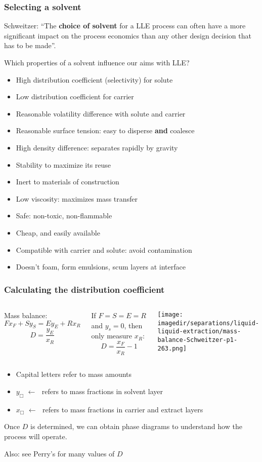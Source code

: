 \begin{frame}\frametitle{Selecting a solvent}
	Schweitzer: ``The \textbf{choice of solvent} for a LLE process can often have a more significant impact on the process economics than any other design decision that has to be made''.
	
	\vspace{12pt}
	Which properties of a solvent influence our aims with LLE?
	\begin{itemize}
		\item	High distribution coefficient (selectivity) for solute 
		\item	Low distribution coefficient for carrier
		\item	Reasonable volatility difference with solute and carrier
		\item	Reasonable surface tension: easy to disperse \textbf{and} coalesce
		\item	High density difference: separates rapidly by gravity
		\item	Stability to maximize its reuse
		\item	Inert to materials of construction
		\item	Low viscosity: maximizes mass transfer
		\item	Safe: non-toxic, non-flammable
		\item	Cheap, and easily available
		\item	Compatible with carrier and solute: avoid contamination
		\item	Doesn't foam, form emulsions, scum layers at interface
	\end{itemize}
\end{frame}

\begin{frame}\frametitle{Calculating the distribution coefficient {\color{myOrange}{(in the lab only)}}}
	\begin{columns}[t]
			Mass balance:
			\[ F x_F + S y_S = E y_E + R x_R \]
			\[ D = \frac{y_E}{x_R} \]

			\vspace{12pt}
			If $F = S = E = R$ and $y_s = 0$, then only measure $x_R$:
			\[ D = \frac{x_F}{x_R} - 1\]
			\begin{center}
				\texttt{[image: \\imagedir/separations/liquid-liquid-extraction/mass-balance-Schweitzer-p1-263.png]}
			\end{center}
	\end{columns}
	\begin{itemize}
		\item	Capital letters refer to mass amounts
		\item	$y_\Box \,\, \leftarrow\,\,$  refers to mass fractions in solvent layer
		\item	$x_\Box \,\, \leftarrow\,\,$  refers to mass fractions in carrier and extract layers
	\end{itemize}
	Once $D$ is determined, we can obtain phase diagrams to understand how the process will operate.
	
	\vspace{12pt}
	Also: see Perry's for many values of $D$
\end{frame}

